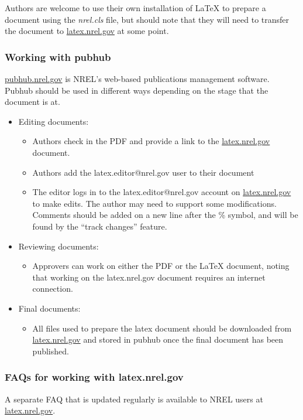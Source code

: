 Authors are welcome to use their own installation of LaTeX to prepare a document using the \emph{nrel.cls} file, but should note that they will need to transfer the document to \href{latex.nrel.gov}{latex.nrel.gov} at some point.

\subsubsection{Working with pubhub}
\href{pubhub.nrel.gov}{pubhub.nrel.gov} is NREL's web-based publications management software. Pubhub should be used in different ways depending on the stage that the document is at.
\begin{itemize}
\item Editing documents: 
\begin{itemize} 
\item Authors check in the PDF and provide a link to the \href{latex.nrel.gov}{latex.nrel.gov} document.
\item Authors add the latex.editor@nrel.gov user to their document
\item The editor logs in to the latex.editor@nrel.gov account on \href{latex.nrel.gov}{latex.nrel.gov} to make edits. The author may need to support some modifications. Comments should be added on a new line after the \% symbol, and will be found by the ``track changes'' feature.
\end{itemize}
\item Reviewing documents:
\begin{itemize} 
\item Approvers can work on either the PDF or the LaTeX document, noting that working on the  latex.nrel.gov document requires an internet connection.
\end{itemize}
\item Final documents: 
\begin{itemize} 
\item All files used to prepare the latex document should be downloaded from \href{latex.nrel.gov}{latex.nrel.gov} and stored in pubhub once the final document has been published.
\end{itemize}
\end{itemize}

\subsubsection{FAQs for working with latex.nrel.gov}
A separate FAQ that is updated regularly is available to NREL users at \href{latex.nrel.gov}{latex.nrel.gov}.

